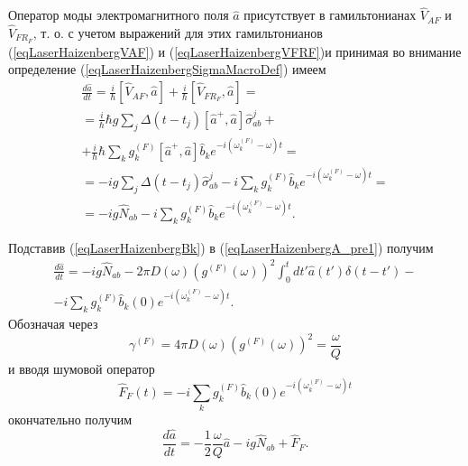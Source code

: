 Оператор моды электромагнитного поля $\hat{a}$ присутствует в
гамильтонианах $\hat{V}_{AF}$ и $\hat{V}_{FR_F}$, т. о.  с учетом
выражений для этих гамильтонианов (\ref{eqLaserHaizenbergVAF}) и 
(\ref{eqLaserHaizenbergVFRF})и принимая во внимание определение
(\ref{eqLaserHaizenbergSigmaMacroDef}) имеем 
\begin{eqnarray}
\frac{d \hat{a}}{d t} = \frac{i}{\hbar}
\left[\hat{V}_{AF}, \hat{a}\right] + 
\frac{i}{\hbar}
\left[\hat{V}_{FR_F}, \hat{a}\right] = 
\nonumber \\
= \frac{i}{\hbar}\hbar g
\sum_j
\Delta\left(t - t_j\right) 
\left[\hat{a}^{+},\hat{a}\right]\hat{\sigma}^{j}_{ab} +
\nonumber \\
+ 
\frac{i}{\hbar}\hbar
\sum_k
g_k^{(F)}
\left[\hat{a}^{+},\hat{a}\right]\hat{b}_k e^{-i\left(\omega_k^{(F)} -
  \omega\right)t} = 
\nonumber \\
= -i g 
\sum_j
\Delta\left(t - t_j\right) \hat{\sigma}^{j}_{ab} -
i \sum_k
g_k^{(F)}\hat{b}_k e^{-i\left(\omega_k^{(F)} -
  \omega\right)t} =
\nonumber \\ 
= -i g \hat{N}_{ab} -
i \sum_k
g_k^{(F)}\hat{b}_k e^{-i\left(\omega_k^{(F)} -
  \omega\right)t}.
\label{eqLaserHaizenbergA_pre1}
\end{eqnarray}

Подставив (\ref{eqLaserHaizenbergBk}) в
(\ref{eqLaserHaizenbergA_pre1}) получим
\begin{eqnarray}
\frac{d \hat{a}}{d t} = 
-i g \hat{N}_{ab}
- 2 \pi
D\left(\omega\right) \left(g^{(F)}\left(\omega\right)\right)^2
\int_0^td t' \hat{a}\left(t'\right)\delta\left(t - t'\right) - 
\nonumber \\
-
i
\sum_k
g_k^{(F)}\hat{b}_k \left(0\right)e^{-i\left(\omega_k^{(F)} -
  \omega\right)t}.
\nonumber
\end{eqnarray}
Обозначая через 
\[
\gamma^{(F)} = 4 \pi
D\left(\omega\right) \left(g^{(F)}\left(\omega\right)\right)^2 = \frac{\omega}{Q}
\]
и вводя шумовой оператор
\begin{equation}
\hat{F}_F\left(t\right) = - i
\sum_k
g_k^{(F)}\hat{b}_k \left(0\right)e^{-i\left(\omega_k^{(F)} -
  \omega\right)t}
\label{eqLaserHaizenbergFF}
\end{equation}
окончательно получим
\begin{equation}
\frac{d \hat{a}}{d t} = 
- \frac{1}{2}\frac{\omega}{Q}\hat{a}
-i g \hat{N}_{ab} + 
\hat{F}_F.
\label{eqLaserHaizenbergA}
\end{equation}

